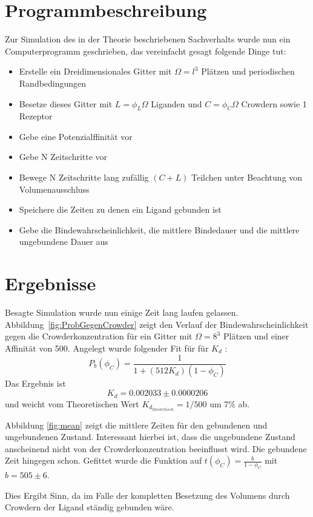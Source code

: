 \documentclass[bachelor,       %
               twoside,        %
               BCOR10mm,       %
               english,ngerman, %
               ]{GAUBM}
\begin{document}
\chapter{Programmbeschreibung}
Zur Simulation des in der Theorie beschriebenen Sachverhalts wurde nun ein Computerprogramm geschrieben, das
vereinfacht gesagt folgende Dinge tut:
\begin{itemize}
\item Erstelle ein Dreidimensionales Gitter mit $\Omega = l^3$ Plätzen und periodischen Randbedingungen
\item Besetze dieses Gitter mit $L = \phi_L\Omega$ Liganden und $C = \phi_C\Omega$ Crowdern sowie 1 Rezeptor
\item Gebe eine Potenzialffinität vor
\item Gebe N Zeitschritte vor
\item Bewege N Zeitschritte lang zufällig $(C+L)$ Teilchen unter Beachtung von Volumenausschluss
\item Speichere die Zeiten zu denen ein Ligand gebunden ist
\item Gebe die Bindewahrscheinlichkeit, die mittlere Bindedauer und die mittlere ungebundene Dauer aus
\end{itemize}

\chapter{Ergebnisse}
Besagte Simulation wurde nun einige Zeit lang laufen gelassen.
Abbildung~\ref{fig:ProbGegenCrowder} zeigt den Verlauf der Bindewahrscheinlichkeit
gegen die Crowderkonzentration für ein Gitter mit $\Omega = 8^3$ Plätzen und einer
Affinität von 500. Angelegt wurde folgender Fit für für $K_d$ :
\begin{equation}
P_b(\phi_C) = \frac{1}{1+(512K_d)(1-\phi_C)}
\end{equation}
Das Ergebnis ist
\begin{equation}
K_d = 0.002033 \pm 0.0000206
\end{equation}
und weicht vom Theoretischen Wert $K_{d_{theoretisch}} = 1/500 $ um 7\% ab.

Abbildung \ref{fig:mean} zeigt die mittlere Zeiten für den gebundenen und ungebundenen
Zustand. Interessant hierbei ist, dass die ungebundene Zustand anscheinend nicht von
der Crowderkonzentration beeinflusst wird. Die gebundene Zeit hingegen schon.
Gefittet wurde die Funktion auf $t(\phi_C) = \frac{b}{1-\phi_C}$ mit $b = 505 \pm 6$.

Dies Ergibt Sinn, da im Falle der kompletten Besetzung des Volumens durch Crowdern der
Ligand ständig gebunden wäre.
\end{document}
